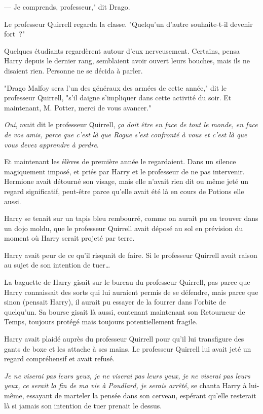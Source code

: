 --- Je comprends, professeur," dit Drago.

Le professeur Quirrell regarda la classe. "Quelqu'un d'autre souhaite-t-il devenir fort~?"

Quelques étudiants regardèrent autour d'eux nerveusement. Certains, pensa Harry depuis le dernier rang, semblaient avoir ouvert leurs bouches, mais ils ne disaient rien. Personne ne se décida à parler.

"Drago Malfoy sera l'un des généraux des armées de cette année," dit le professeur Quirrell, "s'il daigne s'impliquer dans cette activité du soir. Et maintenant, M. Potter, merci de vous avancer."

\later

\emph{Oui}, avait dit le professeur Quirrell, \emph{ça doit être en face de tout le monde, en face de vos amis, parce que c'est là que Rogue s'est confronté à vous et c'est là que vous devez apprendre à perdre}.

Et maintenant les élèves de première année le regardaient. Dans un silence magiquement imposé, et priés par Harry et le professeur de ne pas intervenir. Hermione avait détourné son visage, mais elle n'avait rien dit ou même jeté un regard significatif, peut-être parce qu'elle avait été là en cours de Potions elle aussi.

Harry se tenait sur un tapis bleu rembourré, comme on aurait pu en trouver dans un dojo moldu, que le professeur Quirrell avait déposé au sol en prévision du moment où Harry serait projeté par terre.

Harry avait peur de ce qu'il risquait de faire. Si le professeur Quirrell avait raison au sujet de son intention de tuer…

La baguette de Harry gisait sur le bureau du professeur Quirrell, pas parce que Harry connaissait des sorts qui lui auraient permis de se défendre, mais parce que sinon (pensait Harry), il aurait pu essayer de la fourrer dans l'orbite de quelqu'un. Sa bourse gisait là aussi, contenant maintenant son Retourneur de Temps, toujours protégé mais toujours potentiellement fragile.

Harry avait plaidé auprès du professeur Quirrell pour qu'il lui transfigure des gants de boxe et les attache à ses mains. Le professeur Quirrell lui avait jeté un regard compréhensif et avait refusé.

\emph{Je ne viserai pas leurs yeux, je ne viserai pas leurs yeux, je ne viserai pas leurs yeux, ce serait la fin de ma vie à Poudlard, je serais arrêté}, se chanta Harry à lui-même, essayant de marteler la pensée dans son cerveau, espérant qu'elle resterait là si jamais son intention de tuer prenait le dessus.

